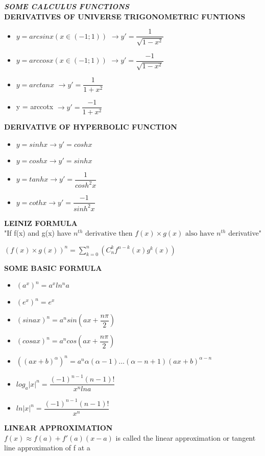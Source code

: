 \documentclass[10pt]{article}
\begin{document}
\textit{\textbf{SOME CALCULUS FUNCTIONS }}\\
 \textbf{DERIVATIVES OF UNIVERSE TRIGONOMETRIC FUNTIONS}
\begin{itemize}
	\item $y = arcsinx (x \in (-1;1))$
	$\rightarrow{y' = \dfrac{1}{\sqrt{1-x^2}}}$
	\item $y = arccosx (x \in (-1;1) )$
	$\rightarrow{y' = \dfrac{-1}{\sqrt{1-x^2}}}$
	\item $y = arctanx$
	$\rightarrow{y' = \dfrac{1}{1+x^2}}$
	\item y = arccotx
	$\rightarrow{y' = \dfrac{-1}{1+x^2}}$
\end{itemize}
 \textbf{DERIVATIVE OF HYPERBOLIC FUNCTION}
\begin{itemize}
    \item $y=sinhx \rightarrow{y'=coshx}$
    \item $y=coshx \rightarrow{y'=sinhx}$
    \item $y=tanhx \rightarrow{y'=\dfrac{1}{cosh^{2}x}}$
    \item $y=cothx \rightarrow{y'=\dfrac{-1}{sinh^{2}x}}$
\end{itemize}
 \textbf{{LEINIZ FORMULA}}\\
"If f(x) and g(x) have $n^{th} \mbox{ derivative then }f(x) \times g(x) \mbox{ also have }n^{th}$ derivative"\\
\begin{center}
$(f(x)\times g(x))^{n} = \displaystyle \sum_{k=0}^{n}(C^k_nf^{n-k}(x)g^k(x))$\\
\end{center}
 \textbf{SOME BASIC FORMULA}\\
\begin{itemize}
	\item $(a^x)^n = a^{x}ln^{n}a$
	\item $(e^x)^n = e^{x}$
	\item $(sinax)^n = a^nsin(ax + \dfrac{n\pi}{2})$
	\item $(cosax)^n = a^ncos(ax + \dfrac{n\pi}{2})$
	\item $((ax+b)^{\alpha})^n = a^n\alpha(\alpha-1)\ldots(\alpha-n+1)(ax+b)^{\alpha-n}$
	\item $log_a{|x|}^{n} = \dfrac{(-1)^{n-1}(n-1)!}{x^{n}lna}$
	\item $ln|x|^n = \dfrac{(-1)^{n-1}(n-1)!}{x^n}$
\end{itemize}
 \textbf{LINEAR APPROXIMATION}\\
$f(x) \approx f(a) + f'(a)(x-a)$ is called the linear approximation or tangent line approximation of f at a\\
\end{document}

